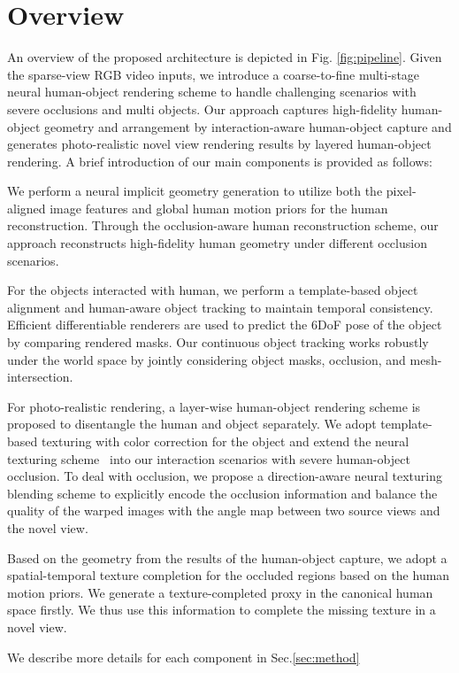 % 
\section{Overview}
An overview of the proposed architecture is depicted in Fig. \ref{fig:pipeline}. Given the sparse-view RGB video inputs, we introduce a coarse-to-fine multi-stage neural human-object rendering scheme to handle challenging scenarios with severe occlusions and multi objects. Our approach captures high-fidelity human-object geometry and arrangement by interaction-aware human-object capture and generates photo-realistic novel view rendering results by layered human-object rendering. 
% 
A brief introduction of our main components is provided as follows:
% 


% 
We perform a neural implicit geometry generation to utilize both the pixel-aligned image features and global human motion priors for the human reconstruction. Through the occlusion-aware human reconstruction scheme, our approach reconstructs high-fidelity human geometry under different occlusion scenarios.

For the objects interacted with human, we perform a template-based object alignment and human-aware object tracking to maintain temporal consistency.
%
Efficient differentiable renderers are used to predict the 6DoF pose of the object by comparing rendered masks. 
%
%
Our continuous object tracking works robustly under the world space by jointly considering object masks, occlusion, and mesh-intersection. 

For photo-realistic rendering, a layer-wise human-object rendering scheme is proposed to disentangle the human and object separately.
%
We adopt template-based texturing with color correction for the object and extend the neural texturing scheme~\cite{NeuralHumanFVV2021CVPR} into our interaction scenarios with severe human-object occlusion.
%
To deal with occlusion, we propose a direction-aware neural texturing blending scheme to explicitly encode the occlusion information and balance the quality of the warped images with the angle map between two source views and the novel view.

Based on the geometry from the results of the human-object capture, we adopt a spatial-temporal texture completion for the occluded regions based on the human motion priors.
%
We generate a texture-completed proxy in the canonical human space firstly. We thus use this information to complete the missing texture in a novel view.
%


We describe more details for each component in Sec.\ref{sec:method}


